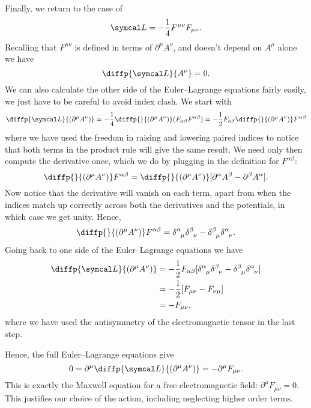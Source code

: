 Finally, we return to the case of
\begin{equation}
    \lagrangianDensity = -\frac{1}{4}F^{\mu\nu}F_{\mu\nu}.
\end{equation}
Recalling that \(F^{\mu\nu}\) is defined in terms of \(\partial^\mu A^\nu\), and doesn't depend on \(A^\mu\) alone we have
\begin{equation}
    \diffp{\lagrangianDensity}{A^\nu} = 0.
\end{equation}
We can also calculate the other side of the Euler--Lagrange equations fairly easily, we just have to be careful to avoid index clash.
We start with
\begin{equation}
    \diffp{\lagrangianDensity}{(\partial^\mu A^\nu)} = -\frac{1}{4}\diffp{}{(\partial^\mu A^\nu)} (F_{\alpha\beta}F^{\alpha\beta}) = -\frac{1}{2} F_{\alpha\beta} \diffp{}{(\partial^\mu A^\nu)} F^{\alpha\beta}
\end{equation}
where we have used the freedom in raising and lowering paired indices to notice that both terms in the product rule will give the same result.
We need only then compute the derivative once, which we do by plugging in the definition for \(F^{\alpha\beta}\):
\begin{equation}
    \diffp{}{(\partial^\mu A^\nu)} F^{\alpha\beta} = \diffp{}{(\partial^\mu A^\nu)} [\partial^\alpha A^\beta - \partial^\beta A^\alpha].
\end{equation}
Now notice that the derivative will vanish on each term, apart from when the indices match up correctly across both the derivatives and the potentials, in which case we get unity.
Hence,
\begin{equation}
    \diffp{}{(\partial^\mu A^\nu)} F^{\alpha\beta} = \tensor{\delta}{^\alpha_\mu} \tensor{\delta}{^\beta_\nu} - \tensor{\delta}{^\beta_\mu} \tensor{\delta}{^\alpha_\nu}.
\end{equation}
Going back to one side of the Euler--Lagrange equations we have
\begin{align}
    \diffp{\lagrangianDensity}{(\partial^\mu A^\nu)} &= -\frac{1}{2}F_{\alpha\beta}[\tensor{\delta}{^\alpha_\mu}\tensor{\delta}{^\beta_\nu} - \tensor{\delta}{^\beta_\mu} \tensor{\delta}{^\alpha_\nu}]\\
    &= -\frac{1}{2}[F_{\mu\nu} - F_{\nu\mu}]\\
    &= -F_{\mu\nu},
\end{align}
where we have used the antisymmetry of the electromagnetic tensor in the last step.

Hence, the full Euler--Lagrange equations give
\begin{equation}\label{eqn:free field eom}
    0 = \partial^\mu \diffp{\lagrangianDensity}{(\partial^\mu A^\nu)} = -\partial^\mu F_{\mu\nu}.
\end{equation}
This is exactly the Maxwell equation for a free electromagnetic field: \(\partial^\mu F_{\mu\nu} = 0\).
This justifies our choice of the action, including neglecting higher order terms.

